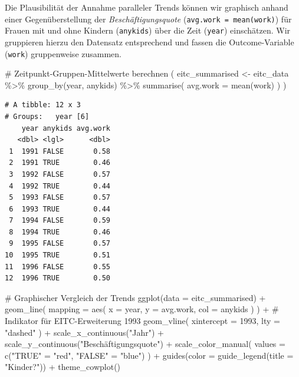 \documentclass[
  a4paper,
  DIV=11,
  oneside]{scrreprt}
\newenvironment{Shaded}{\begin{snugshade}}{\end{snugshade}}
\newcommand{\AttributeTok}[1]{\textcolor[rgb]{0.40,0.45,0.13}{#1}}
\newcommand{\CommentTok}[1]{\textcolor[rgb]{0.37,0.37,0.37}{#1}}
\newcommand{\DecValTok}[1]{\textcolor[rgb]{0.68,0.00,0.00}{#1}}
\newcommand{\FunctionTok}[1]{\textcolor[rgb]{0.28,0.35,0.67}{#1}}
\newcommand{\NormalTok}[1]{\textcolor[rgb]{0.00,0.23,0.31}{#1}}
\newcommand{\OtherTok}[1]{\textcolor[rgb]{0.00,0.23,0.31}{#1}}
\newcommand{\SpecialCharTok}[1]{\textcolor[rgb]{0.37,0.37,0.37}{#1}}
\newcommand{\StringTok}[1]{\textcolor[rgb]{0.13,0.47,0.30}{#1}}
\begin{document}
Die Plausibilität der Annahme paralleler Trends können wir graphisch
anhand einer Gegenüberstellung der \emph{Beschäftigungsquote}
(\texttt{avg.work\ =\ mean(work)}) für Frauen mit und ohne Kindern
(\texttt{anykids}) über die Zeit (\texttt{year}) einschätzen. Wir
gruppieren hierzu den Datensatz entsprechend und fassen die
Outcome-Variable (\texttt{work}) gruppenweise zusammen.

\begin{Shaded}
\begin{Highlighting}[]
\CommentTok{\# Zeitpunkt{-}Gruppen{-}Mittelwerte berechnen}
\NormalTok{(}
\NormalTok{  eitc\_summarised }\OtherTok{\textless{}{-}}\NormalTok{ eitc\_data }\SpecialCharTok{\%\textgreater{}\%}
  \FunctionTok{group\_by}\NormalTok{(year, anykids) }\SpecialCharTok{\%\textgreater{}\%}
  \FunctionTok{summarise}\NormalTok{(}
    \AttributeTok{avg.work =} \FunctionTok{mean}\NormalTok{(work)}
\NormalTok{  )}
\NormalTok{)}
\end{Highlighting}
\end{Shaded}

\begin{verbatim}
# A tibble: 12 x 3
# Groups:   year [6]
    year anykids avg.work
   <dbl> <lgl>      <dbl>
 1  1991 FALSE       0.58
 2  1991 TRUE        0.46
 3  1992 FALSE       0.57
 4  1992 TRUE        0.44
 5  1993 FALSE       0.57
 6  1993 TRUE        0.44
 7  1994 FALSE       0.59
 8  1994 TRUE        0.46
 9  1995 FALSE       0.57
10  1995 TRUE        0.51
11  1996 FALSE       0.55
12  1996 TRUE        0.50
\end{verbatim}

\begin{Shaded}
\begin{Highlighting}[]
\CommentTok{\# Graphischer Vergleich der Trends}
\FunctionTok{ggplot}\NormalTok{(}\AttributeTok{data =}\NormalTok{ eitc\_summarised) }\SpecialCharTok{+}
  \FunctionTok{geom\_line}\NormalTok{(}
    \AttributeTok{mapping =} \FunctionTok{aes}\NormalTok{(}
      \AttributeTok{x =}\NormalTok{ year, }
      \AttributeTok{y =}\NormalTok{ avg.work, }
      \AttributeTok{col =}\NormalTok{ anykids}
\NormalTok{    )}
\NormalTok{  ) }\SpecialCharTok{+}
  \CommentTok{\# Indikator für EITC{-}Erweiterung 1993}
  \FunctionTok{geom\_vline}\NormalTok{(}
    \AttributeTok{xintercept =} \DecValTok{1993}\NormalTok{, }
    \AttributeTok{lty =} \StringTok{"dashed"}
\NormalTok{  ) }\SpecialCharTok{+}
  \FunctionTok{scale\_x\_continuous}\NormalTok{(}\StringTok{"Jahr"}\NormalTok{) }\SpecialCharTok{+}
  \FunctionTok{scale\_y\_continuous}\NormalTok{(}\StringTok{"Beschäftigungsquote"}\NormalTok{) }\SpecialCharTok{+}
  \FunctionTok{scale\_color\_manual}\NormalTok{(}
    \AttributeTok{values =} \FunctionTok{c}\NormalTok{(}\StringTok{"TRUE"} \OtherTok{=} \StringTok{"red"}\NormalTok{, }\StringTok{"FALSE"} \OtherTok{=} \StringTok{"blue"}\NormalTok{)}
\NormalTok{  ) }\SpecialCharTok{+}
  \FunctionTok{guides}\NormalTok{(}\AttributeTok{color =} \FunctionTok{guide\_legend}\NormalTok{(}\AttributeTok{title =} \StringTok{"Kinder?"}\NormalTok{)) }\SpecialCharTok{+}
  \FunctionTok{theme\_cowplot}\NormalTok{()}
\end{Highlighting}
\end{Shaded}
\end{document}
